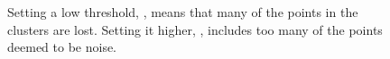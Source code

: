 \begin{figure}[ht]
    \centering
    \begin{subfigure}[b]{0.4\textwidth}
        \caption{}\label{fig:grid-noise-low.png}
    \end{subfigure}%
    \qquad
    \begin{subfigure}[b]{0.4\textwidth}
        \caption{}\label{fig:grid-noise-high.png}
    \end{subfigure}
    \caption{Setting a low threshold, , means
    that many of the points in the clusters are lost. Setting it higher,
    , includes too many of the points deemed to
    be noise.}\label{fig:grid-noise}
\end{figure}
